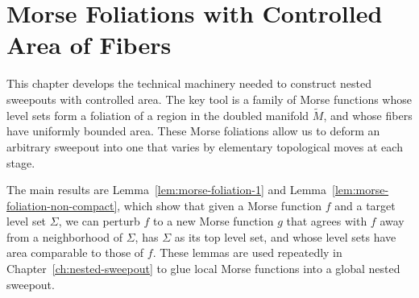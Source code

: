 \chapter{Morse Foliations with Controlled Area of Fibers}\label{ch:morse-foliation}

This chapter develops the technical machinery needed to construct nested sweepouts with controlled area. The key tool is a family of Morse functions whose level sets form a foliation of a region in the doubled manifold $\widetilde{M}$, and whose fibers have uniformly bounded area. These Morse foliations allow us to deform an arbitrary sweepout into one that varies by elementary topological moves at each stage.


The main results are Lemma~\ref{lem:morse-foliation-1} and Lemma~\ref{lem:morse-foliation-non-compact}, which show that given a Morse function $f$ and a target level set $\Sigma$, we can perturb $f$ to a new Morse function $g$ that agrees with $f$ away from a neighborhood of $\Sigma$, has $\Sigma$ as its top level set, and whose level sets have area comparable to those of $f$. These lemmas are used repeatedly in Chapter~\ref{ch:nested-sweepout} to glue local Morse functions into a global nested sweepout.

